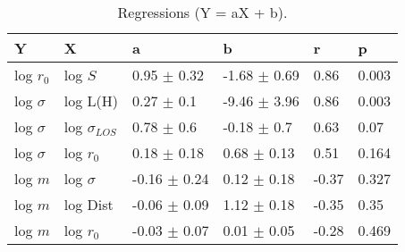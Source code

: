 \begin{table}
\centering
\caption{Regressions (Y = aX + b).}
\begin{tabular}{llllll}
\toprule
            Y &                   X &                 a &                 b &      r &      p \\
\midrule
    log $r_0$ &             log $S$ &   0.95 $\pm$ 0.32 &  -1.68 $\pm$ 0.69 &   0.86 &  0.003 \\
 log $\sigma$ &            log L(H) &    0.27 $\pm$ 0.1 &  -9.46 $\pm$ 3.96 &   0.86 &  0.003 \\
 log $\sigma$ &  log $\sigma_{LOS}$ &    0.78 $\pm$ 0.6 &   -0.18 $\pm$ 0.7 &   0.63 &   0.07 \\
 log $\sigma$ &         log $r_{0}$ &   0.18 $\pm$ 0.18 &   0.68 $\pm$ 0.13 &   0.51 &  0.164 \\
      log $m$ &        log $\sigma$ &  -0.16 $\pm$ 0.24 &   0.12 $\pm$ 0.18 &  -0.37 &  0.327 \\
      log $m$ &            log Dist &  -0.06 $\pm$ 0.09 &   1.12 $\pm$ 0.18 &  -0.35 &   0.35 \\
      log $m$ &         log $r_{0}$ &  -0.03 $\pm$ 0.07 &   0.01 $\pm$ 0.05 &  -0.28 &  0.469 \\
\bottomrule
\end{tabular}
\end{table}
